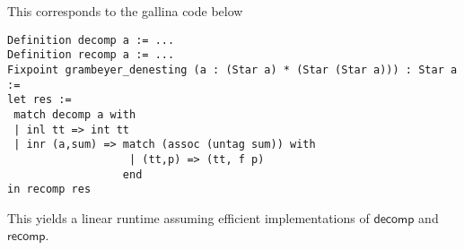\begin{example}[Grabmeyer]
This corresponds to the gallina code below
\begin{verbatim}
Definition decomp a := ...
Definition recomp a := ...
Fixpoint grambeyer_denesting (a : (Star a) * (Star (Star a))) : Star a := 
let res := 
 match decomp a with 
 | inl tt => int tt 
 | inr (a,sum) => match (assoc (untag sum)) with 
                   | (tt,p) => (tt, f p)
                  end 
in recomp res
\end{verbatim}
This yields a linear runtime assuming efficient implementations of $\mathsf{decomp}$ and $\mathsf{recomp}$.
\end{example}








